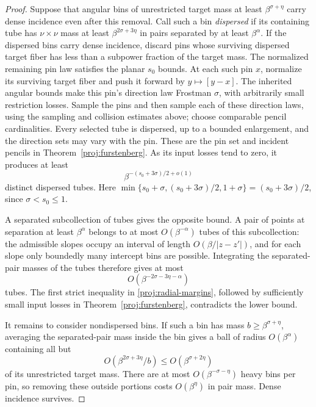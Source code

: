 \begin{proof}
Suppose that angular bins of unrestricted target mass at least
$\beta^{\sigma+\eta}$ carry dense incidence even after this removal.
Call such a bin \emph{dispersed} if its containing tube has
$\nu\times\nu$ mass at least $\beta^{2\sigma+3\eta}$ in pairs
separated by at least $\beta^\alpha$. If the dispersed bins carry
dense incidence, discard pins whose surviving dispersed target fiber
has less than a subpower fraction of the target mass. The normalized
remaining pin law satisfies the planar $s_0$ bounds. At each such pin
$x$, normalize its surviving target fiber and push it forward by
$y\mapsto[y-x]$. The inherited angular bounds make this pin's
direction law Frostman $\sigma$, with arbitrarily small restriction
losses. Sample the pins and then sample each of these direction laws,
using the sampling and collision estimates above; choose comparable
pencil cardinalities. Every selected tube is dispersed, up to a
bounded enlargement, and the direction sets may vary with the pin.
These are the pin set and incident pencils in
Theorem~\ref{proj:furstenberg}. As its input losses tend to zero, it
produces at least
\[
 \beta^{-(s_0+3\sigma)/2+o(1)}
\]
distinct dispersed tubes. Here
$\min\{s_0+\sigma,(s_0+3\sigma)/2,1+\sigma\}
=(s_0+3\sigma)/2$, since $\sigma<s_0\le1$.

A separated subcollection of tubes gives the opposite bound. A pair
of points at separation at least $\beta^\alpha$ belongs to at most
$O(\beta^{-\alpha})$ tubes of this subcollection: the admissible
slopes occupy an interval of length $O(\beta/|z-z'|)$, and for each
slope only boundedly many intercept bins are possible. Integrating
the separated-pair masses of the tubes therefore gives at most
\[
 O(\beta^{-2\sigma-3\eta-\alpha})
\]
tubes. The first strict inequality in
\eqref{proj:radial-margins}, followed by sufficiently small input
losses in Theorem~\ref{proj:furstenberg}, contradicts the lower bound.

It remains to consider nondispersed bins. If such a bin has mass
$b\ge\beta^{\sigma+\eta}$, averaging the separated-pair mass inside
the bin gives a ball of radius $O(\beta^\alpha)$ containing all but
\[
 O(\beta^{2\sigma+3\eta}/b)
 \le O(\beta^{\sigma+2\eta})
\]
of its unrestricted target mass. There are at most
$O(\beta^{-\sigma-\eta})$ heavy bins per pin, so removing these
outside portions costs $O(\beta^\eta)$ in pair mass. Dense incidence
survives.


\end{proof}
